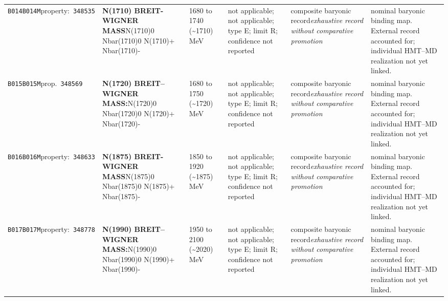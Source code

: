 \begin{landscape}
\begin{longtable}{L{1.85cm}L{4.45cm}L{2.35cm}L{4.05cm}L{3.35cm}L{7.15cm}}
\texttt{B014}\newline \texttt{B014M}\newline property:\ \texttt{348535} & \textbf{N(1710) BREIT-WIGNER MASS}\newline N(1710)0 \textbar{}\allowbreak{} Nbar(1710)0 \textbar{}\allowbreak{} N(1710)+ \textbar{}\allowbreak{} Nbar(1710)- & 1680 to 1740 (\textasciitilde{}1710)\,MeV & not applicable; not applicable; type E; limit R; confidence not reported & composite baryonic record\newline \emph{exhaustive record without comparative promotion} & nominal baryonic binding map. External record accounted for; individual HMT--MD realization not yet linked. \\
\texttt{B015}\newline \texttt{B015M}\newline prop.\ \texttt{348569} & \textbf{N(1720) BREIT--WIGNER MASS:}\newline N(1720)0 \textbar{}\allowbreak{} Nbar(1720)0 \textbar{}\allowbreak{} N(1720)+ \textbar{}\allowbreak{} Nbar(1720)- & 1680 to 1750 (\textasciitilde{}1720)\,MeV & not applicable; not applicable; type E; limit R; confidence not reported & composite baryonic record\newline \emph{exhaustive record without comparative promotion} & nominal baryonic binding map. External record accounted for; individual HMT--MD realization not yet linked. \\
\texttt{B016}\newline \texttt{B016M}\newline property:\ \texttt{348633} & \textbf{N(1875) BREIT-WIGNER MASS}\newline N(1875)0 \textbar{}\allowbreak{} Nbar(1875)0 \textbar{}\allowbreak{} N(1875)+ \textbar{}\allowbreak{} Nbar(1875)- & 1850 to 1920 (\textasciitilde{}1875)\,MeV & not applicable; not applicable; type E; limit R; confidence not reported & composite baryonic record\newline \emph{exhaustive record without comparative promotion} & nominal baryonic binding map. External record accounted for; individual HMT--MD realization not yet linked. \\
\texttt{B017}\newline \texttt{B017M}\newline property:\ \texttt{348778} & \textbf{N(1990) BREIT--WIGNER MASS:}\newline N(1990)0 \textbar{}\allowbreak{} Nbar(1990)0 \textbar{}\allowbreak{} N(1990)+ \textbar{}\allowbreak{} Nbar(1990)- & 1950 to 2100 (\textasciitilde{}2020)\,MeV & not applicable; not applicable; type E; limit R; confidence not reported & composite baryonic record\newline \emph{exhaustive record without comparative promotion} & nominal baryonic binding map. External record accounted for; individual HMT--MD realization not yet linked. \\

\end{longtable}
\end{landscape}
